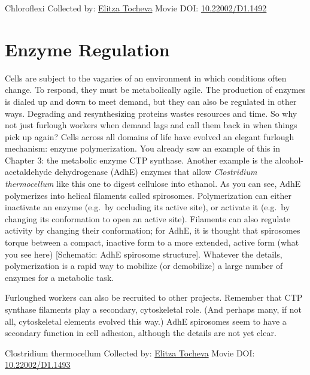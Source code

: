\documentclass[]{tufte-book}
\begin{document}
\hypertarget{htmlwidget-d7cc3a7a628b169136b2}{}

\label{fig:4-4}Chloroflexi Collected by: \protect\hyperlink{elitza_tocheva}{Elitza Tocheva} Movie DOI: \href{https://doi.org/10.22002/D1.1492}{10.22002/D1.1492}

\hypertarget{enzyme-regulation}{%
\section{Enzyme Regulation}\label{enzyme-regulation}}

Cells are subject to the vagaries of an environment in which conditions often change. To respond, they must be metabolically agile. The production of enzymes is dialed up and down to meet demand, but they can also be regulated in other ways. Degrading and resynthesizing proteins wastes resources and time. So why not just furlough workers when demand lags and call them back in when things pick up again? Cells across all domains of life have evolved an elegant furlough mechanism: enzyme polymerization. You already saw an example of this in Chapter 3: the metabolic enzyme CTP synthase. Another example is the alcohol-acetaldehyde dehydrogenase (AdhE) enzymes that allow \emph{Clostridium thermocellum} like this one to digest cellulose into ethanol. As you can see, AdhE polymerizes into helical filaments called spirosomes. Polymerization can either inactivate an enzyme (e.g.~by occluding its active site), or activate it (e.g.~by changing its conformation to open an active site). Filaments can also regulate activity by changing their conformation; for AdhE, it is thought that spirosomes torque between a compact, inactive form to a more extended, active form (what you see here) {[}Schematic: AdhE spirosome structure{]}. Whatever the details, polymerization is a rapid way to mobilize (or demobilize) a large number of enzymes for a metabolic task.

Furloughed workers can also be recruited to other projects. Remember that CTP synthase filaments play a secondary, cytoskeletal role. (And perhaps many, if not all, cytoskeletal elements evolved this way.) AdhE spirosomes seem to have a secondary function in cell adhesion, although the details are not yet clear.



\hypertarget{htmlwidget-c44e844ab35570f59012}{}

\label{fig:4-5}Clostridium thermocellum Collected by: \protect\hyperlink{elitza_tocheva}{Elitza Tocheva} Movie DOI: \href{https://doi.org/10.22002/D1.1493}{10.22002/D1.1493}
\end{document}
